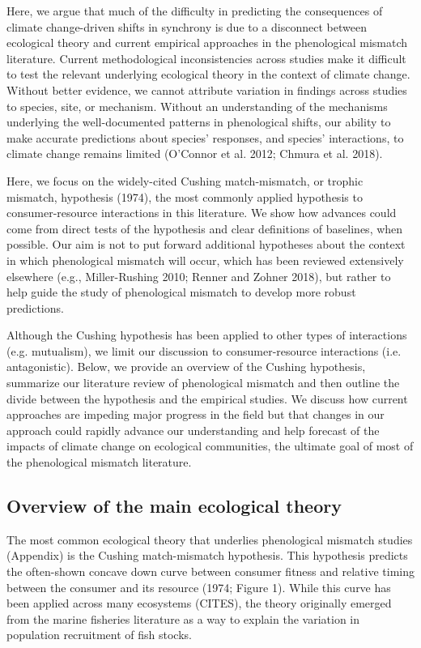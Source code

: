 \documentclass[11pt, oneside]{article}   	%
\begin{document}
Here, we argue that much of the difficulty in predicting the consequences of climate change-driven shifts in synchrony is due to a disconnect between ecological theory and current empirical approaches in the phenological mismatch literature. Current methodological inconsistencies across studies make it difficult to test the relevant underlying ecological theory in the context of climate change. Without better evidence, we cannot attribute variation in findings across studies to species, site, or mechanism. Without an understanding of the mechanisms underlying the well-documented patterns in phenological shifts, our ability to make accurate predictions about species’ responses, and species’ interactions, to climate change remains limited (O’Connor et al. 2012; Chmura et al. 2018). \par

Here, we focus on the widely-cited Cushing match-mismatch, or trophic mismatch, hypothesis (1974), the most commonly applied hypothesis to consumer-resource interactions in this literature. We show how advances could come from direct tests of the hypothesis and clear definitions of baselines, when possible. Our aim is not to put forward additional hypotheses about the context in which phenological mismatch will occur, which has been reviewed extensively elsewhere (e.g., Miller-Rushing 2010; Renner and Zohner 2018), but rather to help guide the study of phenological mismatch to develop more robust predictions. \par

Although the Cushing hypothesis has been applied to other types of interactions (e.g. mutualism), we limit our discussion to consumer-resource interactions (i.e. antagonistic). Below, we provide an overview of the Cushing hypothesis, summarize our literature review of phenological mismatch and then outline the divide between the hypothesis and the empirical studies. We discuss how current approaches are impeding major progress in the field but that changes in our approach could rapidly advance our understanding and help forecast of the impacts of climate change on ecological communities, the ultimate goal of most of the phenological mismatch literature. 

\subsection{Overview of the main ecological theory}
The most common ecological theory that underlies phenological mismatch studies (Appendix) is the Cushing match-mismatch hypothesis. This hypothesis predicts the often-shown concave down curve between consumer fitness and relative timing between the consumer and its resource (1974; Figure 1). While this curve has been applied across many ecosystems (CITES), the theory originally emerged from the marine fisheries literature as a way to explain the variation in population recruitment of fish stocks. 
\end{document}
